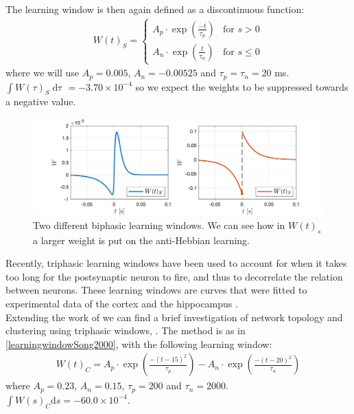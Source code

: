 The learning window is then again defined as a discontinuous function:
\begin{align}
W(t)_S =
\begin{cases}
A_{p} \cdot \exp \left(\frac{-t}{\tau_p}\right) & \text{for } s > 0 \\
A_{n} \cdot \exp \left(\frac{t}{\tau_n}\right)  & \text{for } s \leq 0
\end{cases} \label{eq:learningwindowSong2000}
\end{align}
where we will use $A_p = 0.005$, $A_n = -0.00525$ and $\tau_p = \tau_n = 20$ ms. $\int W(\tau)_S \mathop{d \tau} = -3.70 \times 10^{-4}$ so we expect the weights to be suppressed towards a negative value. 
\begin{figure}[H]
\centering
\includegraphics[width = \textwidth]{../Figures/Learning/LearningWindowsBiphasic.png}
\caption{Two different biphasic learning windows. We can see how in $W(t)_s$ a larger weight is put on the anti-Hebbian learning.}
\label{fig:LearningWindowsBiphasic}
\end{figure}

Recently, triphasic learning windows have been used to account for when it takes too long for the postsynaptic neuron to fire, and thus to decorrelate the relation between neurons. These learning windows are curves that were fitted to experimental data of the cortex and the hippocampus \cite{ChrolCannon2014}. \\

Extending the work of \cite{Song2000} we can find a brief investigation of network topology and clustering using triphasic windows, \cite{ChrolCannon2012}. The method is as in \eqref{learningwindowSong2000}, with the following learning window:
\begin{align}
W(t)_C = A_{p} \cdot \exp \left(\frac{-\left(t - 15 \right)^{2}}{ \tau_{p}}\right) - A_{n} \cdot \exp \left(\frac{-\left(t - 20\right)^{2}}{ \tau_{n}}\right)  \label{eq:learningwindowChrolCannon2012}
\end{align}
where $A_{p}=0.23$, $A_{n}=0.15$, $\tau_{p}=200$ and $\tau_n = 2000$. $\int W(s)_C \mathrm{d}s = -60.0 \times 10^{-4}$.

